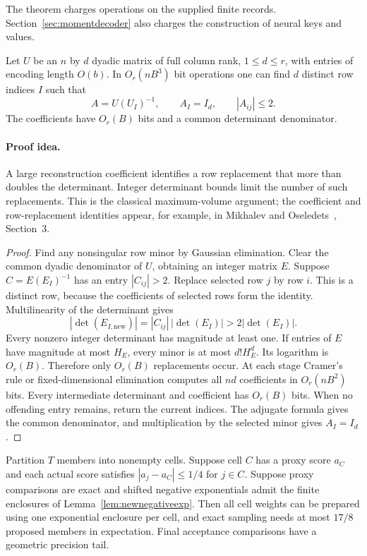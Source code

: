 The theorem charges operations on the supplied finite records.
Section~\ref{sec:momentdecoder} also charges the construction of
neural keys and values.

\begin{lemma}
\label{lem:dynamicchart}
Let $U$ be an $n$ by $d$ dyadic matrix of full column rank,
$1\le d\le r$, with entries of encoding length $O(b)$.
In $O_r(nB^3)$ bit operations one can find $d$ distinct row
indices $I$ such that
\[
 A=U(U_I)^{-1},\qquad A_I=I_d,\qquad |A_{ij}|\le2.
\]
The coefficients have $O_r(B)$ bits and a common determinant
denominator.
\end{lemma}

\paragraph{Proof idea.}
A large reconstruction coefficient identifies a row replacement
that more than doubles the determinant.  Integer determinant
bounds limit the number of such replacements.  This is the
classical maximum-volume argument; the coefficient and
row-replacement identities appear, for example, in
Mikhalev and Oseledets~\cite{mikhalev2018maxvol}, Section~3.

\begin{proof}
Find any nonsingular row minor by Gaussian elimination.  Clear
the common dyadic denominator of $U$, obtaining an integer
matrix $E$.  Suppose $C=E(E_I)^{-1}$ has an entry $|C_{ij}|>2$.
Replace selected row $j$ by row $i$.  This is a distinct row,
because the coefficients of selected rows form the identity.
Multilinearity of the determinant gives
\[
 |\det(E_{I,\mathrm{new}})|
       =|C_{ij}|\,|\det(E_I)|>2|\det(E_I)|.
\]
Every nonzero integer determinant has magnitude at least one.
If entries of $E$ have magnitude at most $H_E$, every minor is
at most $d!H_E^d$.  Its logarithm is $O_r(B)$.  Therefore only
$O_r(B)$ replacements occur.  At each stage Cramer's rule or
fixed-dimensional elimination computes all $nd$ coefficients
in $O_r(nB^2)$ bits.  Every intermediate determinant and
coefficient has $O_r(B)$ bits.  When no offending entry remains,
return the current indices.  The adjugate formula gives the
common denominator, and multiplication by the selected minor
gives $A_I=I_d$.
\end{proof}

\begin{lemma}
\label{lem:dynamiccellenvelope}
Partition $T$ members into nonempty cells.  Suppose cell $C$ has
a proxy score $a_C$ and each actual score satisfies
$|a_j-a_C|\le1/4$ for $j\in C$.  Suppose proxy comparisons
are exact and shifted negative exponentials admit the finite
enclosures of Lemma~\ref{lem:newnegativeexp}.  Then all cell
weights can be prepared using one exponential enclosure per
cell, and exact sampling needs at most $17/8$ proposed members
in expectation.  Final acceptance comparisons have a geometric
precision tail.
\end{lemma}

